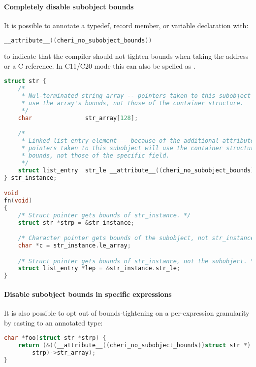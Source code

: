 \documentclass[12pt,twoside,openright,usletter]{article}
\newcommand{\ccode}[1]{{\small\ttfamily{#1}}}
\newcommand{\cxxcode}[1]{{\ccode{#1}}}
\newcommand*{\cpp}[1][]{C\textsmaller[2]{\nolinebreak[4]\hspace{-.05em}\raisebox{.45ex}{\textbf{++}}}}
\begin{document}
\paragraph{Completely disable subobject bounds} It is possible to annotate a typedef, record member,
or variable declaration with:

\begin{lstlisting}[language={C}]
__attribute__((cheri_no_subobject_bounds))
\end{lstlisting}

\noindent
to indicate that the compiler should not tighten bounds when taking the address or a \cpp{} reference. In \cpp{}11/C20 mode this can also be spelled as \cxxcode{[[cheri::no\_subobject\_bounds]]}.

\begin{lstlisting}[language={C}]
struct str {
    /*
     * Nul-terminated string array -- pointers taken to this subobject will
     * use the array's bounds, not those of the container structure.
     */
    char               str_array[128];

    /*
     * Linked-list entry element -- because of the additional attribute,
     * pointers taken to this subobject will use the container structure's
     * bounds, not those of the specific field.
     */
    struct list_entry  str_le __attribute__((cheri_no_subobject_bounds));
} str_instance;

void
fn(void)
{
    /* Struct pointer gets bounds of str_instance. */
    struct str *strp = &str_instance;

    /* Character pointer gets bounds of the subobject, not str_instance. */
    char *c = str_instance.le_array;

    /* Struct pointer gets bounds of str_instance, not the subobject. */
    struct list_entry *lep = &str_instance.str_le;
}
\end{lstlisting}

\paragraph{Disable subobject bounds in specific expressions}
It is also possible to opt out of bounds-tightening on a per-expression
granularity by casting to an annotated type:

\begin{lstlisting}[language={C}]
char *foo(struct str *strp) {
    return (&((__attribute__((cheri_no_subobject_bounds))struct str *)
        strp)->str_array);
}
\end{lstlisting}
\end{document}
